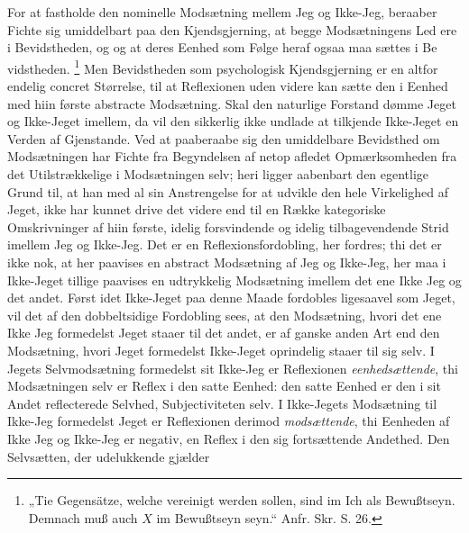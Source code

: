 \documentclass[11pt]{book}
\newcommand{\opage}[1]{\marginnote{\footnotesize\textit{[#1]}}}
\begin{document}
For at fastholde den nominelle Modsætning mellem Jeg og Ikke-Jeg, beraaber Fichte sig umiddelbart paa den Kjendsgjerning, at begge Modsætningens Led ere i Bevidstheden, og
og at deres Eenhed som Følge heraf ogsaa maa sættes i Be\-%
\opage{69} \setcounter{footnote}{0}%
vidstheden.%
\footnote{„Tie Gegensätze, welche vereinigt werden sollen, sind im Ich als Bewußtseyn. Demnach muß auch $X$ im Bewußtseyn seyn.“ Anfr. Skr. S. 26.}
Men Bevidstheden som psychologisk Kjendsgjerning er en altfor endelig concret Størrelse, til at Reflexionen uden videre kan sætte den i Eenhed med hiin første abstracte Modsætning. Skal den naturlige Forstand dømme Jeget og Ikke-Jeget imellem, da vil den sikkerlig ikke undlade at tilkjende Ikke-Jeget en Verden af Gjenstande. Ved at paaberaabe sig den umiddelbare Bevidsthed om Modsætningen har Fichte fra Begyndelsen af netop afledet Opmærksomheden fra det Utilstrækkelige i Modsætningen selv; heri ligger aabenbart den egentlige Grund til, at han med al sin Anstrengelse for at udvikle den hele Virkelighed af Jeget, ikke har kunnet drive det videre end til en Række kategoriske Omskrivninger af hiin første, idelig forsvindende og idelig tilbagevendende Strid imellem Jeg og Ikke-Jeg. Det er en Reflexionsfordobling, her fordres; thi det er ikke nok, at her paavises en abstract Modsætning af Jeg og Ikke-Jeg, her maa i Ikke-Jeget tillige paavises en udtrykkelig Modsætning imellem det ene
Ikke Jeg og det andet. Først idet Ikke-Jeget paa denne Maade fordobles ligesaavel som Jeget, vil det af den dobbeltsidige Fordobling sees, at den Modsætning, hvori det ene Ikke Jeg formedelst Jeget staaer til det andet, er af ganske anden Art end den Modsætning, hvori Jeget formedelst Ikke-Jeget oprindelig staaer til sig selv. I Jegets Selvmodsætning formedelst sit Ikke-Jeg er Reflexionen \emph{eenhedsættende}, thi Modsætningen selv er Reflex i den satte Eenhed: den satte Eenhed er den i sit Andet reflecterede Selvhed, Subjectiviteten selv. I Ikke-Jegets Modsætning til Ikke-Jeg formedelst Jeget er Reflexionen derimod \emph{modsættende}, thi Eenheden af Ikke Jeg og Ikke-Jeg er negativ, en Reflex i den sig fortsættende Andethed. Den Selvsætten, der udelukkende gjælder
\end{document}
